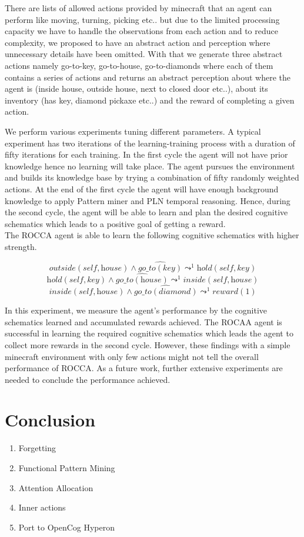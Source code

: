 \documentclass[runningheads]{llncs}
\newcommand{\lpreimp}[1]{\leadsto^{#1}}
\newcommand{\ldo}[1]{\widehat{#1}}
\begin{document}
There are lists of allowed actions provided by minecraft that an agent can perform like moving, turning, picking etc.. but due to the limited processing capacity we have to handle the observations from each action and to reduce complexity, we proposed to have an abstract action and perception where unnecessary details have been omitted. With that we generate three abstract actions namely go-to-key, go-to-house, go-to-diamonds where each of them contains a series of actions and returns an abstract perception about where the agent is (inside house, outside house, next to closed door etc..), about its inventory (has key, diamond pickaxe etc..) and the reward of completing a given action. \par
We perform various experiments tuning different parameters. A typical experiment has two iterations of the learning-training process with a duration of fifty iterations for each training. In the first cycle the agent will not have prior knowledge hence no learning will take place. The agent pursues the environment and builds its knowledge base by trying a combination of fifty randomly weighted actions. At the end of the first cycle the agent will have enough background knowledge to apply Pattern miner and PLN temporal reasoning. Hence, during the second cycle, the agent will be able to learn and plan the desired cognitive schematics which leads to a positive goal of getting a reward.\\
The ROCCA agent is able to learn the following cognitive schematics with higher strength.

$$\textit{outside}(\textit{self}, \textit{house}) \land \ldo{\textit{go\_to}(\textit{key})} \lpreimp{1} \textit{hold}(\textit{self}, \textit{key})$$
$$\textit{hold}(\textit{self}, \textit{key}) \land \ldo{\textit{go\_to}(\textit{house})} \lpreimp{1} \textit{inside}(\textit{self}, \textit{house})$$
$$\textit{inside}(\textit{self}, \textit{house}) \land \ldo{\textit{go\_to}(\textit{diamond})} \lpreimp{1} \textit{reward}(1)$$

In this experiment, we measure the agent's performance by the cognitive schematics learned and accumulated rewards achieved. The ROCAA agent is successful in learning the required cognitive schematics which leads the agent to collect more rewards in the second cycle. However, these findings with a simple minecraft environment with only few actions might not tell the overall performance of ROCCA. As a future work, further extensive experiments are needed to conclude the performance achieved.

\section{Conclusion}

\begin{enumerate}
\item Forgetting
\item Functional Pattern Mining
\item Attention Allocation
\item Inner actions
\item Port to OpenCog Hyperon
\end{enumerate}

%
%
 
\end{document}
